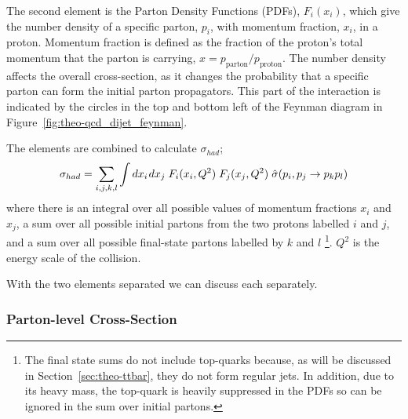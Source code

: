 The second element is the Parton Density Functions (PDFs), $F_i(x_i)$, which give the number density of
a specific parton, $p_i$, with momentum fraction, $x_i$, in a proton.
Momentum fraction is defined as the fraction of the proton's total momentum that the parton is carrying, $x = p_{\text{parton}}/p_{\text{proton}}$.
The number density affects the overall cross-section, as it changes the probability that a specific parton
can form the initial parton propagators.
This part of the interaction is indicated by the circles in the
top and bottom left of the Feynman diagram in Figure~\ref{fig:theo-qcd_dijet_feynman}.

The elements are combined to calculate $\sigma_{had}$;
\begin{equation}
  \sigma_{had} = \sum_{i,j,k,l} \int dx_i\hspace{0.3mm} dx_j \hspace{1mm} F_i(x_i,Q^2)\hspace{1mm}F_j(x_j,Q^2)\hspace{1mm}\hat{\sigma}(p_i, p_j\to p_k p_l)
\end{equation}
where there is an integral over all possible values of momentum fractions $x_i$ and $x_j$,
a sum over all possible initial partons from the two protons labelled $i$ and $j$,
and a sum over all possible final-state partons labelled by $k$ and $l$
\footnote{The final state sums do not include top-quarks because, as will be discussed in Section~\ref{sec:theo-ttbar}, they do not form regular jets. 
  In addition, due to its heavy mass, the top-quark is heavily suppressed in the PDFs so can be ignored in the sum over initial partons.}.
$Q^2$ is the energy scale of the collision.

\noindent
With the two elements separated we can discuss each separately.

\subsubsection{Parton-level Cross-Section}
\label{sec:theo-qcd_dijet_xs}

